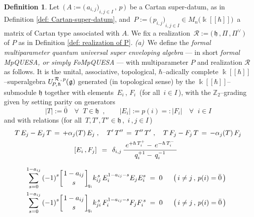 \documentclass[12pt,reqno,twoside,a4paper]{amsart}
\numberwithin{equation}{section}
\theoremstyle{definition}
\newtheorem{definition}[lema]{Definition}
\newtheorem{free text}[lema]{}
\theoremstyle{remark}
\newcommand{\zero}{{\bar{0}}}
\newcommand{\R}{{\mathcal R}}
\def \ZZ {\mathbb{Z}}
\def \kh{{\Bbbk[[\hbar]]}}
\def \lieg{\mathfrak{g}}
\def \lieh{\mathfrak{h}}
\def \uRpPhg{U^{\,\R\,,\,p}_{\!P,\hskip0,7pt\hbar}(\hskip0,5pt\lieg)}
\theoremstyle{plain}
\begin{document}
\begin{definition}  \label{def: FoMpQUESA}
%
 Let  $ \, \big(\, A := {\big(\, a_{i,j} \big)}_{i, j \in I} \, , \, p \,\big) \, $
 be a Cartan super-datum, as in  Definition \ref{def: Cartan-super-datum},  and
 $ \, P := {\big(\, p_{i,j} \big)}_{i, j \in I} \in M_n\big( \kh \big) \, $
 a matrix of Cartan type associated with  $ A $.
 We fix a realization  $ \, \R := \big(\, \lieh \, , \Pi \, , \Pi^\vee \,\big) \, $
 of  $ P $  as in  Definition \ref{def: realization of P}.
%
 \vskip3pt
%
   {\it (a)}\,  We define the  {\sl formal multiparameter quantum universal super
   enveloping algebra}   --- in short  {\sl formal MpQUESA, or simply FoMpQUESA}  ---
   with multiparameter  $ P $  and realization  $ \R $  as follows.
   It is the unital, associative, topological,  $ \hbar $--adically  complete
   $ \kh $--superalgebra  $ \uRpPhg $  generated (in topological sense) by the
   $ \kh $--submodule  $ \lieh $  together with elements
%
 $ \, E_i \, $,  $ F_i \, $  (for all  $ \, i \in I \, $),
%
 with the  $ \ZZ_2 $--grading  given by setting parity on generators
%
  $$  |T| := \zero \quad  \forall \;\; T \in \lieh \;\; ,
  \qquad   |E_i| := p(i) =: |F_i|  \quad \forall \;\; i \in I  $$
%
 and with relations (for all  $ \, T , T' , T'' \in \lieh \, $,  $ \, i \, , j \in I \, $)
%
 \vskip-5pt
%
 \begin{align}
%
 \label{eq: rel T-E / T-T / T-F}
   T \, E_j - E_j \, T \, = \,  +\alpha_j(T) \, E_j  \; ,  \quad
   T' \, T'' \, = \, T'' \, T'  \; ,
   \quad T \, F_j - F_j \, T \, = \, -\alpha_j(T) \, F_j \\
%
 \label{eq: rel E-F}
   [E_i \, , F_j]  \,\; = \;\,
   \delta_{i,j} \, {{\; e^{+\hbar \, T_i^+} -
   \, e^{-\hbar \, T_i^-} \;} \over {\; q_i^{+1} - \, q_i^{-1} \;}}  \hskip93pt
%
\end{align}

\begin{align}
%
   \sum\limits_{s=0}^{1 - a_{ij}} {(-1)}^s {\left[ {{1 - a_{ij}} \atop s}
\right]}_{\!q_i}  &
 k_{ij}^{\,s}
 \, E_i^{1 - a_{ij} - s} E_j E_i^s  \; = \;  0   \quad\;\;  \big(\, i \neq j \, , \, p(i) = \zero \,\big)   \hskip3pt   \label{eq: q-Serre (E)}  \\
%
%
%
 \sum\limits_{s=0}^{1 - a_{ij}} {(-1)}^s {\left[{{1 - a_{ij}} \atop s}
\right]}_{\!q_i}  &
 k_{ji}^{\,s}
 \, F_i^{1 - a_{ij} - s} F_j F_i^{\,s}  \; = \;  0   \quad\;\;  \big(\, i \neq j \, , \, p(i) = \zero \,\big)   \hskip5pt   \label{eq: q-Serre (F)}
%
\end{align}


\end{definition}
\end{document}
